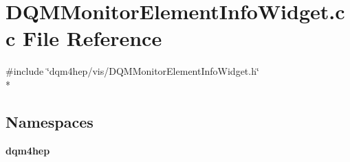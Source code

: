 \section{D\+Q\+M\+Monitor\+Element\+Info\+Widget.\+cc File Reference}
\label{DQMMonitorElementInfoWidget_8cc}
{\ttfamily \#include \char`\"{}dqm4hep/vis/\+D\+Q\+M\+Monitor\+Element\+Info\+Widget.\+h\char`\"{}}\\*
\subsection*{Namespaces}
\begin{DoxyCompactItemize}
\item 
 {\bf dqm4hep}
\end{DoxyCompactItemize}
